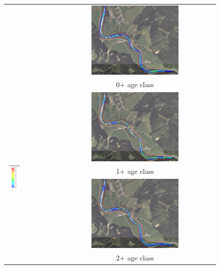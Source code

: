 \centering
\begin{figure}[h!]                                                   	%
	\begin{tabular}{ l  c }
		
		& \includegraphics[width=0.56\textwidth,valign=t]{images/0_0216}\\
		& 0+ age class\\
		\multirow{4}{*}{\includegraphics[width=0.3\textwidth,valign=t]{images/suitability_index}}& \includegraphics[width=0.56\textwidth,valign=t]{images/1_0216}\\
		& 1+ age class\\
		& \includegraphics[width=0.56\textwidth,valign=t]{images/2_0216}\\
		& 2+ age class
		

\end{tabular}
\end{figure}
